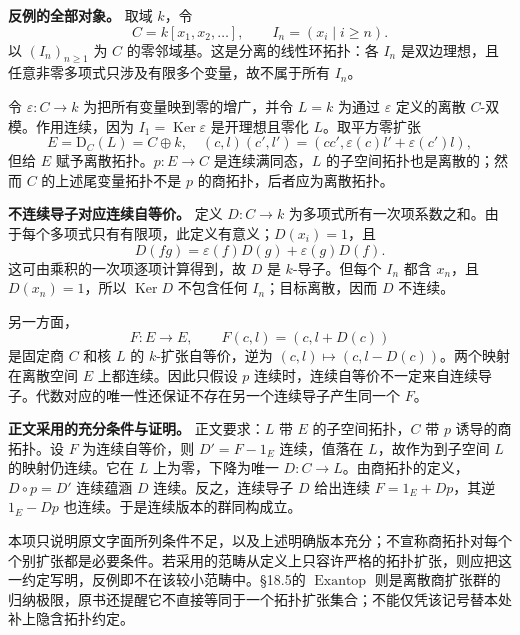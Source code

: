 \documentclass[UTF8,a4paper]{ctexbook}
\DeclareMathOperator{\Ker}{Ker}
\DeclareMathOperator{\Exantop}{Exantop}
\newcommand{\lead}[1]{\par\noindent\textbf{#1}\quad}
\begin{document}
\lead{反例的全部对象。}
取域 $k$，令
\[
 C=k[x_1,x_2,\ldots],\qquad
 I_n=(x_i\mid i\ge n).
\]
以 $(I_n)_{n\ge1}$ 为 $C$ 的零邻域基。这是分离的线性环拓扑：各 $I_n$ 是双边理想，且任意非零多项式只涉及有限多个变量，故不属于所有 $I_n$。

令 $\varepsilon:C\to k$ 为把所有变量映到零的增广，并令 $L=k$ 为通过 $\varepsilon$ 定义的离散 $C$-双模。作用连续，因为 $I_1=\Ker\varepsilon$ 是开理想且零化 $L$。取平方零扩张
\[
 E=\mathrm D_C(L)=C\oplus k,
 \quad(c,l)(c',l')=(cc',\varepsilon(c)l'+\varepsilon(c')l),
\]
但给 $E$ 赋予离散拓扑。$p:E\to C$ 是连续满同态，$L$ 的子空间拓扑也是离散的；然而 $C$ 的上述尾变量拓扑不是 $p$ 的商拓扑，后者应为离散拓扑。

\lead{不连续导子对应连续自等价。}
定义 $D:C\to k$ 为多项式所有一次项系数之和。由于每个多项式只有有限项，此定义有意义；$D(x_i)=1$，且
\[
 D(fg)=\varepsilon(f)D(g)+\varepsilon(g)D(f).
\]
这可由乘积的一次项逐项计算得到，故 $D$ 是 $k$-导子。但每个 $I_n$ 都含 $x_n$，且 $D(x_n)=1$，所以 $\Ker D$ 不包含任何 $I_n$；目标离散，因而 $D$ 不连续。

另一方面，
\[
 F:E\longrightarrow E,\qquad F(c,l)=(c,l+D(c))
\]
是固定商 $C$ 和核 $L$ 的 $k$-扩张自等价，逆为 $(c,l)\mapsto(c,l-D(c))$。两个映射在离散空间 $E$ 上都连续。因此只假设 $p$ 连续时，连续自等价不一定来自连续导子。代数对应的唯一性还保证不存在另一个连续导子产生同一个 $F$。

\lead{正文采用的充分条件与证明。}
正文要求：$L$ 带 $E$ 的子空间拓扑，$C$ 带 $p$ 诱导的商拓扑。设 $F$ 为连续自等价，则 $D'=F-1_E$ 连续，值落在 $L$，故作为到子空间 $L$ 的映射仍连续。它在 $L$ 上为零，下降为唯一 $D:C\to L$。由商拓扑的定义，$D\circ p=D'$ 连续蕴涵 $D$ 连续。反之，连续导子 $D$ 给出连续 $F=1_E+D p$，其逆 $1_E-Dp$ 也连续。于是连续版本的群同构成立。

本项只说明原文字面所列条件不足，以及上述明确版本充分；不宣称商拓扑对每个个别扩张都是必要条件。若采用的范畴从定义上只容许严格的拓扑扩张，则应把这一约定写明，反例即不在该较小范畴中。§18.5的 $\Exantop$ 则是离散商扩张群的归纳极限，原书还提醒它不直接等同于一个拓扑扩张集合；不能仅凭该记号替本处补上隐含拓扑约定。
\end{document}
